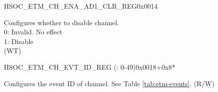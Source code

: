 \begin{register}{H}{SOC\_ETM\_CH\_ENA\_AD1\_CLR\_REG}{0x0014}\label{regdesc:SOCETMCHENAAD1CLRREG}
%
%
%
%
%
%
%
%
%
%
%
%
%
%
%
%
%
%
%
\regnewline%
\begin{regdesc}\begin{reglist}
\label{fielddesc:SOCETMCHDISABLE32}\item [SOC\_ETM\_CH\_DISABLE\regindex{n} (\regindex{n}: 32-49)] Configures whether to disable channel.\\0: Invalid. No effect\\ 1: Disable\\ (WT)
\end{reglist}\end{regdesc}
\end{register}


\begin{register}{H}{SOC\_ETM\_CH\_EVT\_ID\_REG (: 0-49)}{0x0018+0x8*}\label{regdesc:SOCETMCH0EVTIDREG}
%
%
\regnewline%
\begin{regdesc}\begin{reglist}
\label{fielddesc:SOCETMCH0EVTID}\item [SOC\_ETM\_CH\regindex{n}\_EVT\_ID (\regindex{n}: 0-49)] Configures the event ID of channel. See Table \ref{tab:etm-events}. (R/W)
\end{reglist}\end{regdesc}
\end{register}


